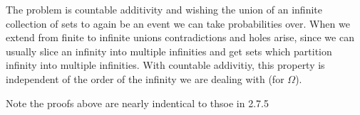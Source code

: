 \documentclass{article}
\begin{document}
The problem is countable additivity and wishing the union of an infinite collection of sets to again be an event we can take probabilities over. When we extend from finite to infinite unions contradictions and holes arise, since we can usually slice an infinity into multiple infinities and get sets which partition infinity into multiple infinities. With countable addivitiy, this property is independent of the order of the infinity we are dealing with (for $\Omega$). 

Note the proofs above are nearly indentical to thsoe in 2.7.5
\end{document}

